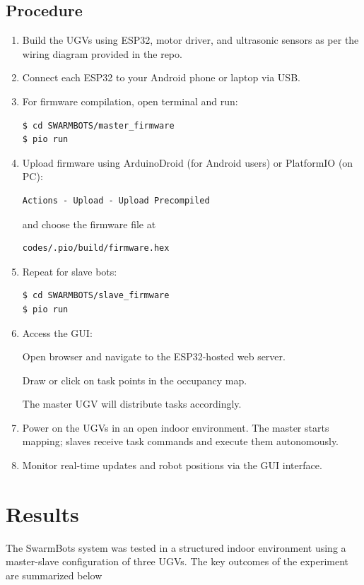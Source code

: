\documentclass[conference]{IEEEtran}
\begin{document}
\subsection{Procedure}
\begin{enumerate}
    \item Build the UGVs using ESP32, motor driver, and ultrasonic sensors as per the wiring diagram provided in the repo.
    \item Connect each ESP32 to your Android phone or laptop via USB.
    \item For firmware compilation, open terminal and run:
        \begin{lstlisting}
$ cd SWARMBOTS/master_firmware
$ pio run
        \end{lstlisting}
    \item Upload firmware using ArduinoDroid (for Android users) or PlatformIO (on PC):
        \begin{lstlisting}
Actions - Upload - Upload Precompiled
        \end{lstlisting}
    and choose the firmware file at
        \begin{lstlisting}
codes/.pio/build/firmware.hex
        \end{lstlisting}
   
\item 
Repeat for slave bots:
        \begin{lstlisting}
$ cd SWARMBOTS/slave_firmware
$ pio run
        \end{lstlisting}
        \item Access the GUI:

Open browser and navigate to the ESP32-hosted web server.

Draw or click on task points in the occupancy map.

The master UGV will distribute tasks accordingly.


         \item  Power on the UGVs in an open indoor environment. The master starts mapping; slaves receive task commands and execute them autonomously.
          \item  Monitor real-time updates and robot positions via the GUI interface. 
          
\end{enumerate}
\section{Results}
\label{sec:results}
The SwarmBots system was tested in a structured indoor environment using a master-slave configuration of three UGVs. The key outcomes of the experiment are summarized below
\end{document}
